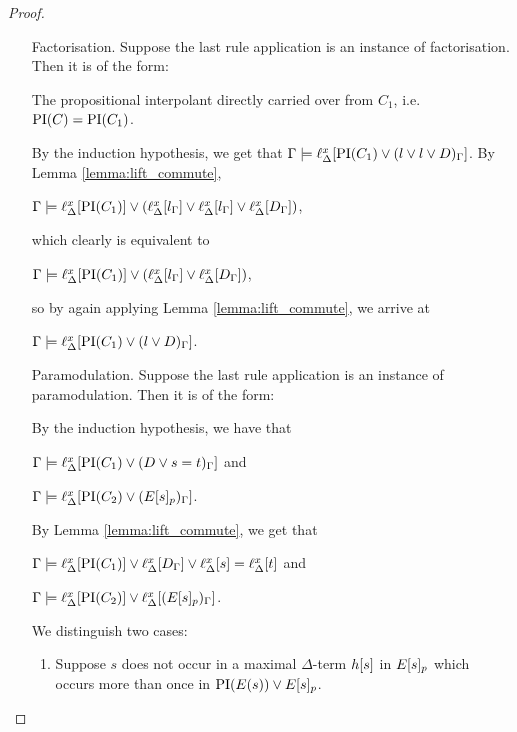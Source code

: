 \begin{proof}
\begin{itemize}
		\item[Factorisation.] Suppose the last rule application is an instance of factorisation. Then it is of the form:
			\begin{prooftree}
			\end{prooftree}

			The propositional interpolant directly carried over from $C_1$, i.e.~$\operatorname{PI}(C) = \operatorname{PI}(C_1)$.

			By the induction hypothesis, we get that $\Gamma \models \ell_{\Delta}^{x}[\operatorname{PI}(C_1) \lor (l \lor l \lor D)_\Gamma]$.
			By Lemma \ref{lemma:lift_commute}, 

			$\Gamma \models \ell_{\Delta}^{x}[\operatorname{PI}(C_1)] \lor (\ell_{\Delta}^{x}[l_\Gamma] \lor  \ell_{\Delta}^{x}[l_\Gamma] \lor \ell_{\Delta}^{x}[D_\Gamma])$,

			which clearly is equivalent to

			$\Gamma \models \ell_{\Delta}^{x}[\operatorname{PI}(C_1)] \lor (\ell_{\Delta}^{x}[l_\Gamma] \lor \ell_{\Delta}^{x}[D_\Gamma])$,

			so by again applying Lemma \ref{lemma:lift_commute}, we arrive at

			$\Gamma \models \ell_{\Delta}^{x}[\operatorname{PI}(C_1) \lor (l \lor D)_\Gamma]$.



		\item[Paramodulation.] Suppose the last rule application is an instance of paramodulation. Then it is of the form:
			\begin{prooftree}
				\AxiomCm{C_1: D \lor s=t}
				\AxiomCm{C_2: E\occurat{s}{p}}
				\BinaryInfCm{C: D \lor E\occurat{t}{p}}
			\end{prooftree}

			By the induction hypothesis, we have that 

			$\Gamma \models \ell_{\Delta}^{x}[\operatorname{PI}(C_1) \lor (D \lor s=t)_\Gamma]$ and 

			$\Gamma \models \ell_{\Delta}^{x}[\operatorname{PI}(C_2) \lor (E{[s]_{p}})_\Gamma]$.

			By Lemma \ref{lemma:lift_commute}, we get that 

			$\Gamma \models \ell_{\Delta}^{x}[\operatorname{PI}(C_1)] \lor \ell_{\Delta}^{x}[D_\Gamma] \lor \ell_{\Delta}^{x}[s]=\ell_{\Delta}^{x}[t]$ and 

			$\Gamma \models \ell_{\Delta}^{x}[\operatorname{PI}(C_2)] \lor \ell_{\Delta}^{x}[(E{[s]_{p}})_\Gamma]$.

			We distinguish two cases:\nopagebreak
			\begin{enumerate}
				\item Suppose $s$ does not occur in a maximal $\Delta$-term $h[s]$ in $E{[s]_{p}}$ which occurs more than once in $\operatorname{PI}(E(s)) \lor E{[s]_{p}}$.


\end{enumerate}
\end{itemize}
\end{proof}
